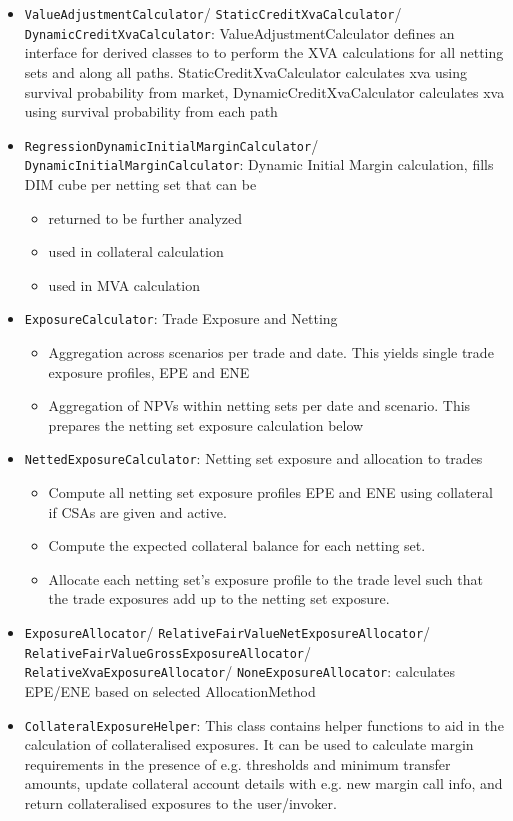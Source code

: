 \documentclass[12pt, a4paper]{report}
\begin{document}
\begin{itemize}
\item {\tt ValueAdjustmentCalculator}/ {\tt StaticCreditXvaCalculator}/ {\tt DynamicCreditXvaCalculator}: ValueAdjustmentCalculator defines an interface for derived classes to to perform the XVA calculations for all netting sets and along all paths. StaticCreditXvaCalculator calculates xva using survival probability from market, DynamicCreditXvaCalculator calculates xva using survival probability from each path
\item {\tt RegressionDynamicInitialMarginCalculator}/ {\tt DynamicInitialMarginCalculator}: Dynamic Initial Margin calculation, fills DIM cube per netting set that can be
\begin{itemize}
\item returned to be further analyzed
\item used in collateral calculation
\item used in MVA calculation
\end{itemize}
\item {\tt ExposureCalculator}: Trade Exposure and Netting
\begin{itemize}
\item Aggregation across scenarios per trade and date. This yields single trade exposure profiles, EPE and ENE
\item Aggregation of NPVs within netting sets per date and scenario. This prepares the netting set exposure calculation below
\end{itemize}
\item {\tt NettedExposureCalculator}: Netting set exposure and allocation to trades
\begin{itemize}
\item Compute all netting set exposure profiles EPE and ENE using collateral if CSAs are given and active.
\item Compute the expected collateral balance for each netting set.
\item Allocate each netting set's exposure profile to the trade level such that the trade exposures add up to the netting set exposure.
\end{itemize}
\item {\tt ExposureAllocator}/ {\tt RelativeFairValueNetExposureAllocator}/ {\tt RelativeFairValueGrossExposureAllocator}/ {\tt RelativeXvaExposureAllocator}/ {\tt NoneExposureAllocator}: calculates EPE/ENE based on selected AllocationMethod
\item {\tt CollateralExposureHelper}: This class contains helper functions to aid in the calculation of collateralised exposures. It can be used to calculate margin requirements in the presence of e.g. thresholds and minimum transfer amounts, update collateral account details with e.g. new margin call info, and return collateralised exposures to the user/invoker.

\end{itemize}
\end{document}
